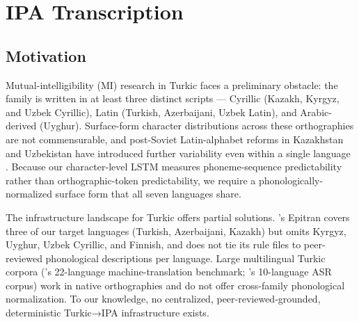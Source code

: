 %
%

\section{IPA Transcription}
\label{sec:ipa}

\subsection{Motivation}
\label{sec:ipa-motivation}

Mutual-intelligibility (MI) research in Turkic faces a preliminary obstacle: the family is written in at least three distinct scripts — Cyrillic (Kazakh, Kyrgyz, and Uzbek Cyrillic), Latin (Turkish, Azerbaijani, Uzbek Latin), and Arabic-derived (Uyghur). Surface-form character distributions across these orthographies are not commensurable, and post-Soviet Latin-alphabet reforms in Kazakhstan and Uzbekistan have introduced further variability even within a single language \citep{mirzakhalov2021large}. Because our character-level LSTM measures phoneme-sequence predictability rather than orthographic-token predictability, we require a phonologically-normalized surface form that all seven languages share.

The infrastructure landscape for Turkic offers partial solutions. \citet{mortensen2018epitran}'s Epitran covers three of our target languages (Turkish, Azerbaijani, Kazakh) but omits Kyrgyz, Uyghur, Uzbek Cyrillic, and Finnish, and does not tie its rule files to peer-reviewed phonological descriptions per language. Large multilingual Turkic corpora (\citealp{mirzakhalov2021large}'s 22-language machine-translation benchmark; \citealp{mussakhojayeva2023multilingual}'s 10-language ASR corpus) work in native orthographies and do not offer cross-family phonological normalization. To our knowledge, no centralized, peer-reviewed-grounded, deterministic Turkic→IPA infrastructure exists.

